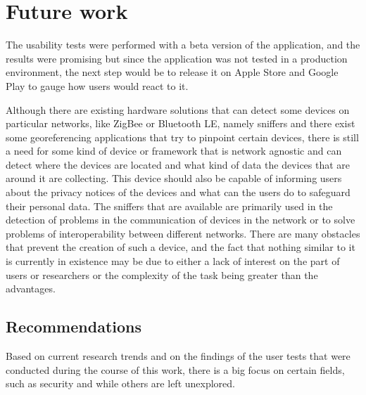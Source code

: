 %
%
\section{Future work}\label{section:future_work}

The usability tests were performed with a beta version of the application,
and the results were promising but since the application was not tested in a production environment,
the next step would be to release it on Apple Store and Google Play to
gauge how users would react to it.

Although there are existing hardware solutions that can detect some devices
on particular networks, like ZigBee or Bluetooth LE, namely \hyperlink{\acronym}{\acronym} sniffers
and there exist some georeferencing applications that try to pinpoint certain
\hyperlink{\acronym}{\acronym} devices, there is still a need for some kind of device or framework
that is network agnostic and can detect where the devices are located and
what kind of data the \hyperlink{\acronym}{\acronym} devices that are around it are collecting. This
device should also be capable of informing users about the privacy notices
of the devices and what can the users do to safeguard their personal data.
The \hyperlink{\acronym}{\acronym} sniffers that are available are primarily used in the detection
of problems in the communication of devices in the network or to solve problems
of interoperability between different \hyperlink{\acronym}{\acronym} networks. There are many obstacles
that prevent the creation of such a device, and the fact that nothing similar
to it is currently in existence may be due to either a lack of interest on the
part of users or researchers or the complexity of the task being greater than
the advantages.

\subsection{Recommendations}\label{subsection:recommendations}

Based on current research trends and on the findings of the user tests that were
conducted during the course of this work, there is a big focus on certain
fields, such as security and \hyperlink{\acronym}{\acronym} while others are left unexplored.

